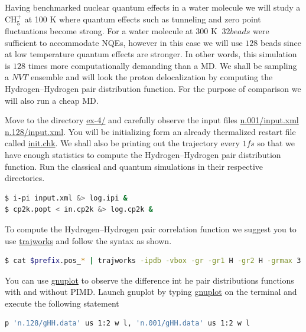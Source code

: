 \documentclass{article}
\begin{document}
\begin{Exercise}[label={basic},title={PIMD in the strong quantum regime:  gas phase Methanium}]
\noindent Having benchmarked nuclear quantum effects in a water molecule we will study a $\text{CH}_{5}^{+}$ at 100 K where quantum effects such as tunneling and zero point fluctuations become strong. For a water molecule at 300 K $~ 32 beads$ were sufficient to accommodate NQEs, however in this case we will use $128$ beads since at low temperature quantum effects are stronger. In other words, this simulation is $128$ times more computationally demanding than a MD. We shall be sampling a $NVT$ ensemble and will look the proton delocalization by computing the Hydrogen--Hydrogen pair distribution function. For the purpose of comparison we will also run a cheap MD.

\Question
Move to the directory \url{ex-4/} and carefully observe the\ipi{} input files \url{n.001/input.xml} \url{n.128/input.xml}. You will be initializing form an already thermalized restart file called \url{init.chk}. We shall also be printing out the trajectory every $1 fs$ so that we have enough statistics to compute the Hydrogen--Hydrogen pair distribution function. Run the classical and quantum simulations in their respective directories.

\begin{lstlisting}[language=bash]
$ i-pi input.xml &> log.ipi &
$ cp2k.popt < in.cp2k &> log.cp2k &
\end{lstlisting}

\Question
To compute the Hydrogen--Hydrogen pair correlation function we suggest you to use \url{trajworks} and follow the syntax as shown. 
\begin{lstlisting}[language=bash]
$ cat $prefix.pos_* | trajworks -ipdb -vbox -gr -gr1 H -gr2 H -grmax 3 -hwin triangle -hwinfac 5  > gHH.data 
\end{lstlisting}

\Question
You can use \url{gnuplot} to observe the difference int he pair distributions functions with and without PIMD. Launch gnuplot by typing \url{gnuplot} on the terminal and execute the following statement 
\begin{lstlisting}[language=bash]
p 'n.128/gHH.data' us 1:2 w l, 'n.001/gHH.data' us 1:2 w l
\end{lstlisting}

\end{Exercise}



\end{document}
